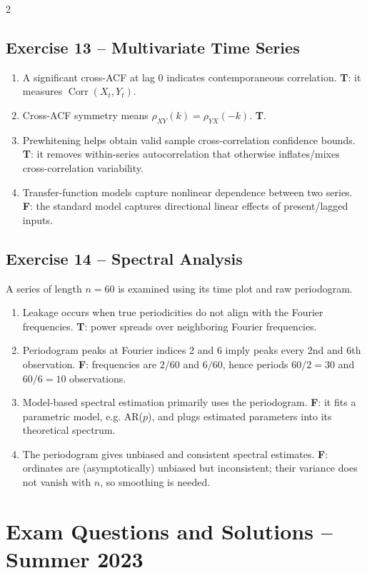 \documentclass[9pt,a4paper]{extarticle}
\begin{document}
\begin{multicols}{2}
\subsection*{Exercise 13 -- Multivariate Time Series}
\begin{enumerate}[label=\alph*),leftmargin=4mm]
\item A significant cross-ACF at lag 0 indicates contemporaneous correlation. \textbf{T}: it measures \(\operatorname{Corr}(X_t,Y_t)\).
\item Cross-ACF symmetry means \(\rho_{XY}(k)=\rho_{YX}(-k)\). \textbf{T}.
\item Prewhitening helps obtain valid sample cross-correlation confidence bounds. \textbf{T}: it removes within-series autocorrelation that otherwise inflates/mixes cross-correlation variability.
\item Transfer-function models capture nonlinear dependence between two series. \textbf{F}: the standard model captures directional linear effects of present/lagged inputs.
\end{enumerate}

\subsection*{Exercise 14 -- Spectral Analysis}
A series of length \(n=60\) is examined using its time plot and raw periodogram.
\begin{enumerate}[label=\alph*),leftmargin=4mm]
\item Leakage occurs when true periodicities do not align with the Fourier frequencies. \textbf{T}: power spreads over neighboring Fourier frequencies.
\item Periodogram peaks at Fourier indices 2 and 6 imply peaks every 2nd and 6th observation. \textbf{F}: frequencies are \(2/60\) and \(6/60\), hence periods \(60/2=30\) and \(60/6=10\) observations.
\item Model-based spectral estimation primarily uses the periodogram. \textbf{F}: it fits a parametric model, e.g. AR(\(p\)), and plugs estimated parameters into its theoretical spectrum.
\item The periodogram gives unbiased and consistent spectral estimates. \textbf{F}: ordinates are (asymptotically) unbiased but inconsistent; their variance does not vanish with \(n\), so smoothing is needed.
\end{enumerate}

\section{Exam Questions and Solutions -- Summer 2023}


\end{multicols}
\end{document}
